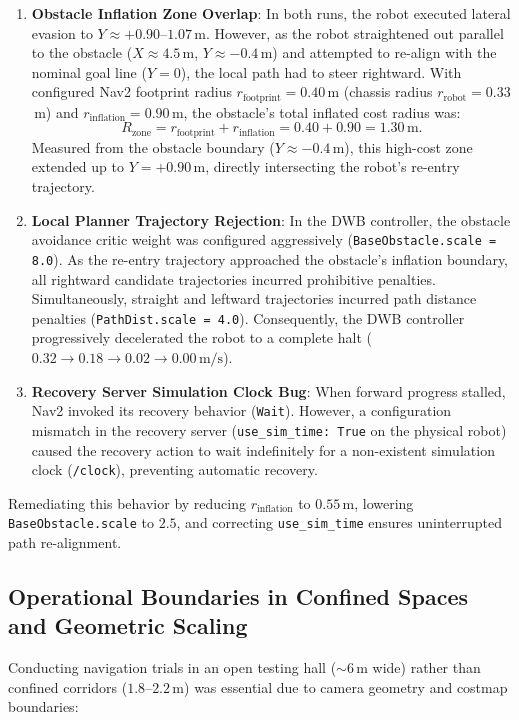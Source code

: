 \documentclass{ieeeaccess}
\begin{document}
\begin{enumerate}
  \item \textbf{Obstacle Inflation Zone Overlap}: In both runs, the robot executed lateral evasion to $Y \approx +0.90\text{--}1.07$\,m. However, as the robot straightened out parallel to the obstacle ($X \approx 4.5$\,m, $Y \approx -0.4$\,m) and attempted to re-align with the nominal goal line ($Y=0$), the local path had to steer rightward. With configured Nav2 footprint radius $r_{\mathrm{footprint}} = 0.40$\,m (chassis radius $r_{\mathrm{robot}} = 0.33$\,m) and $r_{\mathrm{inflation}} = 0.90$\,m, the obstacle's total inflated cost radius was:
  \begin{equation}
    R_{\mathrm{zone}} = r_{\mathrm{footprint}} + r_{\mathrm{inflation}} = 0.40 + 0.90 = 1.30\,\text{m}.
  \end{equation}
  Measured from the obstacle boundary ($Y \approx -0.4$\,m), this high-cost zone extended up to $Y = +0.90$\,m, directly intersecting the robot's re-entry trajectory.
  \item \textbf{Local Planner Trajectory Rejection}: In the DWB controller, the obstacle avoidance critic weight was configured aggressively (\texttt{BaseObstacle.scale}\allowbreak\texttt{ = 8.0}). As the re-entry trajectory approached the obstacle's inflation boundary, all rightward candidate trajectories incurred prohibitive penalties. Simultaneously, straight and leftward trajectories incurred path distance penalties (\texttt{PathDist.scale}\allowbreak\texttt{ = 4.0}). Consequently, the DWB controller progressively decelerated the robot to a complete halt ($0.32 \rightarrow 0.18 \rightarrow 0.02 \rightarrow 0.00\,\text{m/s}$).
  \item \textbf{Recovery Server Simulation Clock Bug}: When forward progress stalled, Nav2 invoked its recovery behavior (\texttt{Wait}). However, a configuration mismatch in the recovery server (\texttt{use\_sim\_time: True} on the physical robot) caused the recovery action to wait indefinitely for a non-existent simulation clock (\texttt{/clock}), preventing automatic recovery.
\end{enumerate}
Remediating this behavior by reducing $r_{\mathrm{inflation}}$ to $0.55$\,m, lowering \texttt{BaseObstacle.scale} to $2.5$, and correcting \texttt{use\_sim\_time} ensures uninterrupted path re-alignment.

\subsection{Operational Boundaries in Confined Spaces and Geometric Scaling}
\label{subsec:corridor_limitations}
Conducting navigation trials in an open testing hall ($\sim 6$\,m wide) rather than confined corridors ($1.8\text{--}2.2$\,m) was essential due to camera geometry and costmap boundaries:
\end{document}
